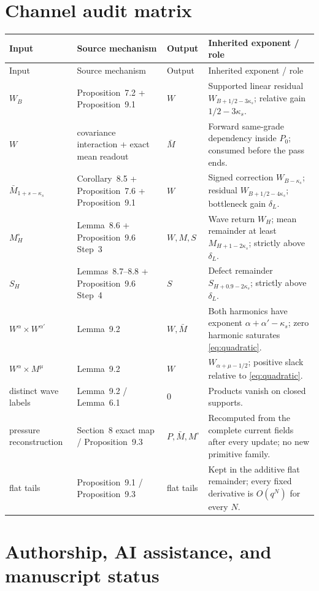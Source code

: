 \documentclass[11pt]{article}
\numberwithin{equation}{section}
\theoremstyle{highend}
\theoremstyle{definition}
\begin{document}
\section{Channel audit matrix}\label{app:channels}
\begin{longtable}{@{}p{}p{}p{}p{}@{}}
\toprule
Input & Source mechanism & Output & Inherited exponent / role \\
\midrule
\endfirsthead
\toprule
Input & Source mechanism & Output & Inherited exponent / role \\
\midrule
\endhead
$W_B$ & Proposition~7.2 + Proposition~9.1 & $W$ & Supported linear residual $W_{B+1/2-3\kappa_s}$; relative gain $1/2-3\kappa_s$. \\
$W$ & covariance interaction + exact mean readout & $\bar M$ & Forward same-grade dependency inside $P_0$; consumed before the pass ends. \\
$\bar M_{1+s-\kappa_s}$ & Corollary~8.5 + Proposition~7.6 + Proposition~9.1 & $W$ & Signed correction $W_{B-\kappa_s}$; residual $W_{B+1/2-4\kappa_s}$; bottleneck gain $\delta_L$. \\
$M^\circ_H$ & Lemma~8.6 + Proposition~9.6 Step~3 & $W,M,S$ & Wave return $W_H$; mean remainder at least $M_{H+1-2\kappa_s}$; strictly above $\delta_L$. \\
$S_H$ & Lemmas~8.7--8.8 + Proposition~9.6 Step~4 & $S$ & Defect remainder $S_{H+0.9-2\kappa_s}$; strictly above $\delta_L$. \\
$W^\alpha\times W^{\alpha'}$ & Lemma~9.2 & $W,\bar M$ & Both harmonics have exponent $\alpha+\alpha'-\kappa_s$; zero harmonic saturates \eqref{eq:quadratic}. \\
$W^\alpha\times M^\mu$ & Lemma~9.2 & $W$ & $W_{\alpha+\mu-1/2}$; positive slack relative to \eqref{eq:quadratic}. \\
distinct wave labels & Lemma~9.2 / Lemma~6.1 & $0$ & Products vanish on closed supports. \\
pressure reconstruction & Section~8 exact map / Proposition~9.3 & $P,\bar M,M^\circ$ & Recomputed from the complete current fields after every update; no new primitive family. \\
flat tails & Proposition~9.1 / Proposition~9.3 & flat tails & Kept in the additive flat remainder; every fixed derivative is $O(q^N)$ for every $N$. \\
\bottomrule
\end{longtable}

\section{Authorship, AI assistance, and manuscript status}\label{app:ai}
\end{document}
